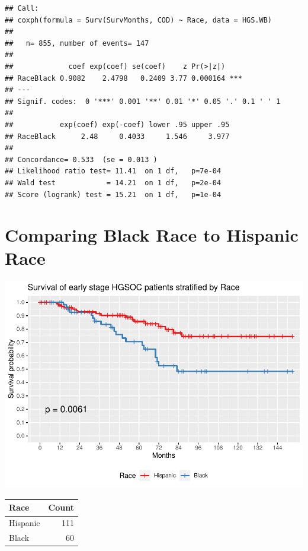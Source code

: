 \documentclass[
]{article}
\begin{document}
\begin{verbatim}
## Call:
## coxph(formula = Surv(SurvMonths, COD) ~ Race, data = HGS.WB)
## 
##   n= 855, number of events= 147 
## 
##             coef exp(coef) se(coef)    z Pr(>|z|)    
## RaceBlack 0.9082    2.4798   0.2409 3.77 0.000164 ***
## ---
## Signif. codes:  0 '***' 0.001 '**' 0.01 '*' 0.05 '.' 0.1 ' ' 1
## 
##           exp(coef) exp(-coef) lower .95 upper .95
## RaceBlack      2.48     0.4033     1.546     3.977
## 
## Concordance= 0.533  (se = 0.013 )
## Likelihood ratio test= 11.41  on 1 df,   p=7e-04
## Wald test            = 14.21  on 1 df,   p=2e-04
## Score (logrank) test = 15.21  on 1 df,   p=1e-04
\end{verbatim}

\hypertarget{comparing-black-race-to-hispanic-race}{%
\section{Comparing Black Race to Hispanic
Race}\label{comparing-black-race-to-hispanic-race}}

\includegraphics{EarlyOvaryRace_files/figure-latex/unnamed-chunk-6-1.pdf}

\begin{tabular}[t]{l|r}
\hline
Race & Count\\
\hline
Hispanic & 111\\
\hline
Black & 60\\
\hline
\end{tabular}
\end{document}
